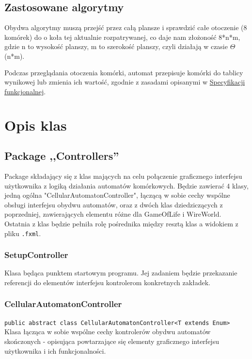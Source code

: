 \documentclass{report}
\begin{document}
\section{Zastosowane algorytmy}
\begin{samepage}
	Obydwa algorytmy muszą przejść przez całą plansze i sprawdzić całe otoczenie (8 komórek) do o koła tej aktualnie rozpatrywanej, co daje nam złożoność 8*n*m, gdzie n to wysokość planszy, m to szerokość planszy, czyli działają w czasie $\Theta$(n*m).

	Podczas przeglądania otoczenia komórki, automat przepisuje komórki do tablicy wynikowej lub zmienia ich wartość, zgodnie z zasadami opisanymi w \href{https://github.com/boguszj/Wire-world/blob/master/Specyfikacja-funkcjonalna/Specyfikacja-funkcjonalna.pdf}{Specyfikacji funkcjonalnej}.
\end{samepage}



\chapter{Opis klas}

\section{Package ,,Controllers''}
Package składający się z klas mających na celu połączenie graficznego interfejsu użytkownika z logiką działania automatów komórkowych. Będzie zawierać 4 klasy, jedną ogólna "CellularAutomatonController", łączącą w sobie cechy wspólne obsługi interfejsu obydwu automatów, oraz z dwóch klas dziedziczących z poprzedniej, zawierających elementu różne dla GameOfLife i WireWorld. Ostatnia z klas będzie pełniła rolę pośrednika między resztą klas a widokiem z pliku \texttt{.fxml}.

\subsection{SetupController}
Klasa będąca punktem startowym programu. Jej zadaniem będzie przekazanie referencji do elementów interfejsu kontrolerom konkretnych zakładek.

\subsection{CellularAutomatonController} %
\texttt{public abstract class CellularAutomatonController<T extends Enum>}
Klasa łącząca w sobie wspólne cechy kontrolerów obydwu automatów skończonych - opisująca powtarzające się elementy graficznego interfejsu użytkownika i ich funkcjonalności.
\end{document}
